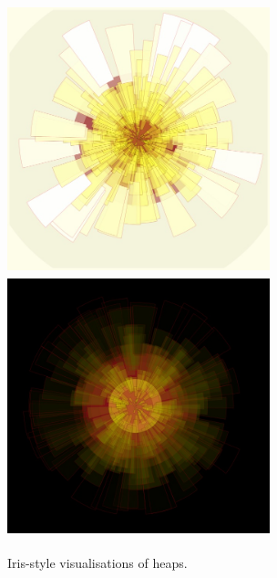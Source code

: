 \documentclass[letterpaper, 12pt]{article}
\begin{document}
\begin{figure}
	\centering
		\includegraphics[width=3in, height=3in]{2013-heapIris-white}
		\includegraphics[width=3in, height=3in]{2013-heapIris-black}
	\caption{Iris-style visualisations of heaps.}
	\label{fig:fig_2013-heapIris-white}
\end{figure}
\end{document}
